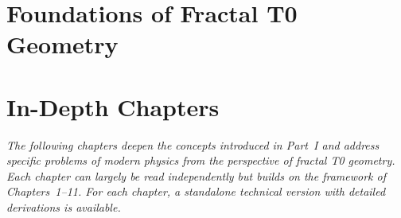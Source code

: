 \documentclass[11pt,openright,twoside]{book}
\begin{document}

\part{Foundations of Fractal T0 Geometry}













\part{In-Depth Chapters}

\noindent\textit{The following chapters deepen the concepts introduced in Part~I and address specific problems of modern physics from the perspective of fractal T0 geometry. Each chapter can largely be read independently but builds on the framework of Chapters~1--11. For each chapter, a standalone technical version with detailed derivations is available.}

\vspace{1cm}














%


















\end{document}
